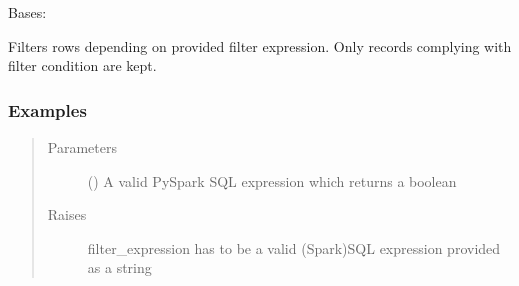 \documentclass[a4paper,10pt, twoside,english]{sphinxmanual}
\begin{document}
\begin{fulllineitems}
\label{\detokenize{transformer/sieve:spooq2.transformer.sieve.Sieve}}
Bases: {\hyperref[\detokenize{base_classes/transformer:spooq2.transformer.transformer.Transformer}]{}}

Filters rows depending on provided filter expression.
Only records complying with filter condition are kept.
\subsubsection*{Examples}

\begin{sphinxVerbatim}[commandchars=\\\{\}]
  
\end{sphinxVerbatim}

\begin{sphinxVerbatim}[commandchars=\\\{\}]
  
\end{sphinxVerbatim}
\begin{quote}\begin{description}
\item[{Parameters}] \leavevmode
{} () \textendash{} A valid PySpark SQL expression which returns a boolean

\item[{Raises}] \leavevmode
{} \textendash{} filter\_expression has to be a valid (Spark)SQL expression provided as a string


\end{description}
\end{quote}
\end{fulllineitems}
\end{document}
